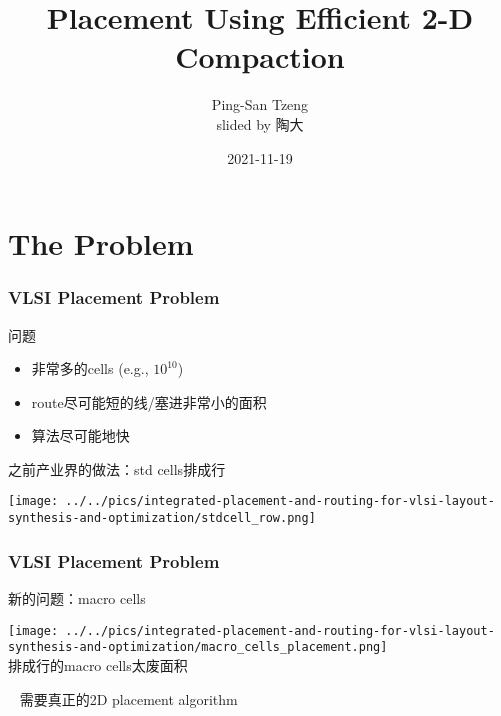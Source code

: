 \documentclass[UTF8,lualatex]{ctexbeamer}
\title{\kaishu Placement Using Efficient 2-D Compaction}
\author{Ping-San Tzeng\\
        slided by 陶大}
\date{2021-11-19}
\begin{document}
\songti
    
\begin{frame}
\titlepage
\end{frame}

\section{The Problem}

\begin{frame}
    \frametitle{VLSI Placement Problem}

    \begin{alertblock}{问题}
        \begin{itemize}
            \item 非常多的cells (e.g., $10^{10}$)
            \item route尽可能短的线/塞进非常小的面积
            \item 算法尽可能地快
        \end{itemize}
    \end{alertblock}
    \begin{exampleblock}{之前产业界的做法：std cells排成行}
        \begin{center}
            \texttt{[image: ../../pics/integrated-placement-and-routing-for-vlsi-layout-synthesis-and-optimization/stdcell\_row.png]}
        \end{center}
    \end{exampleblock}
\end{frame}

\begin{frame}
    \frametitle{VLSI Placement Problem}

    \begin{alertblock}{新的问题：macro cells}
        \begin{center}
            \texttt{[image: ../../pics/integrated-placement-and-routing-for-vlsi-layout-synthesis-and-optimization/macro\_cells\_placement.png]}
            \\
            排成行的macro cells太废面积
        \end{center}
    \end{alertblock}
    \begin{block}{~}
        需要真正的2D placement algorithm
    \end{block}
\end{frame}
\end{document}
